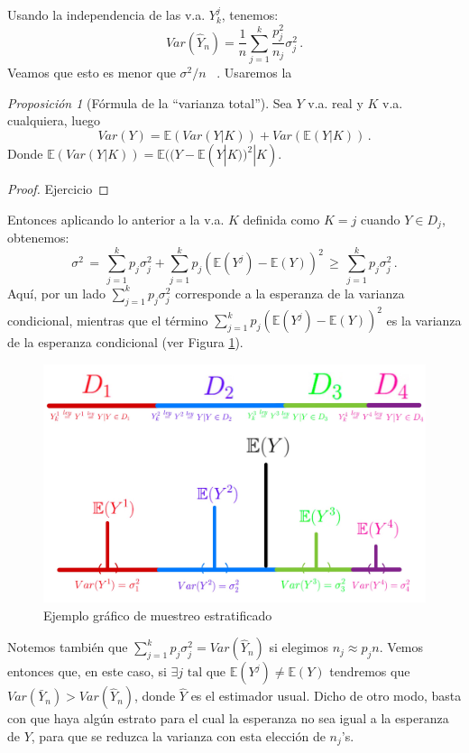 \documentclass[letterpaper,11pt]{article} %
\theoremstyle{defbreak}
\theoremstyle{propbreak}
\theoremstyle{remark}
\theoremstyle{break}
\newtheorem{proposition}{Proposición}[subsection]
\def\E{\mathbb{E}}
\def\var{Var}
\def\ejercicio{\color{blue}Ejercicio\color{black}}
\def\tq{\mbox{ tal que }}
\begin{document}
\newline Usando la independencia de las v.a.  $Y_{k}^j$,  tenemos: %
$$ \var(\hat{Y}_n)=\displaystyle\frac{1}{n}\sum^k_{j=1}\frac{p_j^2}{n_j}\sigma^2_j \, .$$
Veamos que esto es menor que $\sigma^2/n$ \, . Usaremos la
\begin{proposition}[Fórmula de la ``varianza total'']
Sea $Y$ v.a. real y $K$ v.a. cualquiera, luego
$$ \var(Y)=\E(\var(Y|K))+\var(\E(Y|K)) \, .$$
Donde $\E(\var(Y|K))=\E((Y-\E(Y|K))^2|K)$.
\end{proposition}
\begin{proof}
\ejercicio
\end{proof}
Entonces aplicando lo anterior a  la v.a. $K$ definida como $K=j$ cuando $Y\in D_j$, obtenemos:
$$ \sigma^2\,=\,\displaystyle\sum^k_{j=1}p_j\sigma^2_j+\sum^k_{j=1}p_j(\E(Y^j)-\E(Y))^2\,\geq \,\sum^k_{j=1}p_j\sigma^2_j \, .$$
Aqu\'i, por un lado $\sum^k_{j=1}p_j\sigma^2_j$ corresponde a la esperanza de la varianza condicional, mientras que el término $\sum^k_{j=1}p_j(\E(Y^j)-\E(Y))^2$ es la varianza de la esperanza condicional (ver Figura \ref{fig:estrat}). 
\begin{figure}
    \centering
    \includegraphics[scale=0.17]{img/clase_09_pag_3.jpg}
    \caption{Ejemplo gráfico de muestreo estratificado}
    \label{fig:estrat}
\end{figure}

\newp Notemos tambi\'en que  $\sum^k_{j=1}p_j\sigma^2_j= \var(\hat{Y}_n)$ si elegimos  $n_j\approx p_jn$.  Vemos entonces que, en este caso,   si $\exists j\tq\E(Y^j)\neq\E(Y)$ tendremos que $\var(\bar{Y}_n)>\var(\hat{Y}_n)$, donde $\hat{Y}$ es el estimador usual.   Dicho de otro modo, basta con que haya algún estrato para el cual la esperanza no sea igual a la esperanza de $Y$, para que se reduzca la varianza con esta elecci\'on de $n_j$'s.
\end{document}
